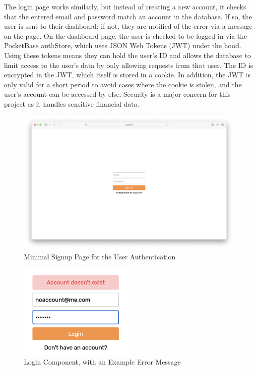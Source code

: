 The login page works similarly, but instead of creating a new account, it checks that the entered email and password match an account in the database. If so, the user is sent to their dashboard; if not, they are notified of the error via a message on the page. On the dashboard page, the user is checked to be logged in via the PocketBase authStore, which uses JSON Web Tokens (JWT) under the hood. Using these tokens means they can hold the user's ID and allows the database to limit access to the user's data by only allowing requests from that user. The ID is encrypted in the JWT, which itself is stored in a cookie. In addition, the JWT is only valid for a short period to avoid cases where the cookie is stolen, and the user's account can be accessed by  else. Security is a major concern for this project as it handles sensitive financial data.

\begin{figure}[H]
	\centering
	\includegraphics[width=\textwidth]{images/signup_page.png}
	\caption{Minimal Signup Page for the User Authentication}
	\label{fig:Signup_page}
\end{figure}

\begin{figure}[H]
	\centering
	\includegraphics[width=0.5\textwidth]{images/no_account.png}
	\caption{Login Component, with an Example Error Message}
	\label{fig:Login_component}
\end{figure}

